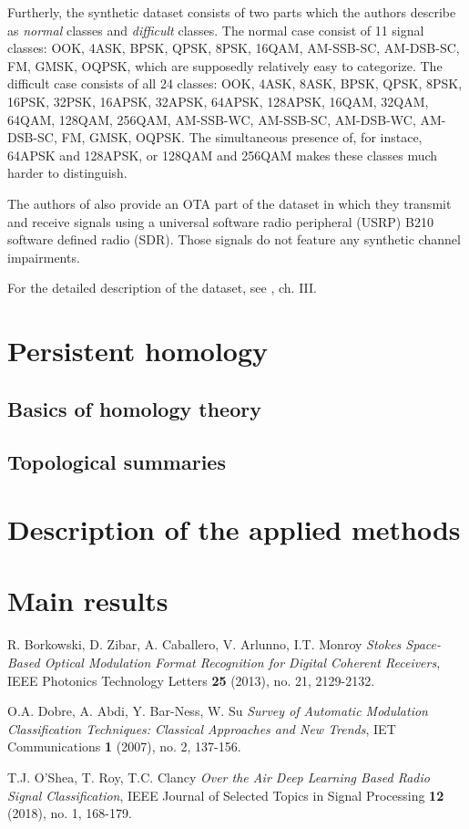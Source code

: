 \documentclass[12pt]{article}
\theoremstyle{plain}
\theoremstyle{definition}
\theoremstyle{remark}
\begin{document}
	Furtherly, the synthetic dataset consists of two parts which the authors describe as \textit{normal} classes and \textit{difficult} classes. The normal case consist of 11 signal classes: OOK, 4ASK, BPSK, QPSK, 8PSK, 16QAM, AM-SSB-SC, AM-DSB-SC, FM, GMSK, OQPSK, which are supposedly relatively easy to categorize. The difficult case consists of all 24 classes: OOK, 4ASK, 8ASK, BPSK, QPSK, 8PSK, 16PSK, 32PSK, 16APSK, 32APSK, 64APSK, 128APSK, 16QAM, 32QAM, 64QAM, 128QAM, 256QAM, AM-SSB-WC, AM-SSB-SC, AM-DSB-WC, AM-DSB-SC, FM, GMSK, OQPSK. The simultaneous presence of, for instace,  64APSK and 128APSK, or 128QAM and 256QAM makes these classes much harder to distinguish.
	
	The authors of \cite{ORC} also provide an OTA part of the dataset in which they transmit and receive signals using a universal software radio peripheral (USRP) B210 software defined radio (SDR). Those signals do not feature any synthetic channel impairments.
		
	For the detailed description of the dataset, see \cite{ORC}, ch. III.
	
	\section{Persistent homology}
	
	\subsection{Basics of homology theory}
	
	\subsection{Topological summaries}
	
	\section{Description of the applied methods}
	
	\section{Main results}
	
	\begin{thebibliography}{10}
		
		R. Borkowski, D. Zibar, A. Caballero, V. Arlunno, I.T. Monroy \emph{Stokes Space-Based Optical Modulation Format Recognition for Digital Coherent Receivers}, IEEE Photonics Technology Letters {\bf 25} (2013), no. 21, 2129-2132.
		
		O.A. Dobre, A. Abdi, Y. Bar-Ness, W. Su \emph{Survey of Automatic Modulation Classification Techniques: Classical Approaches and New Trends}, IET Communications {\bf 1} (2007), no. 2, 137-156.
		
		T.J. O'Shea, T. Roy, T.C. Clancy \emph{Over the Air Deep Learning Based Radio Signal Classification}, IEEE Journal of Selected Topics in Signal Processing {\bf 12} (2018), no. 1, 168-179.
		
	\end{thebibliography}
	
	
	
\end{document}

